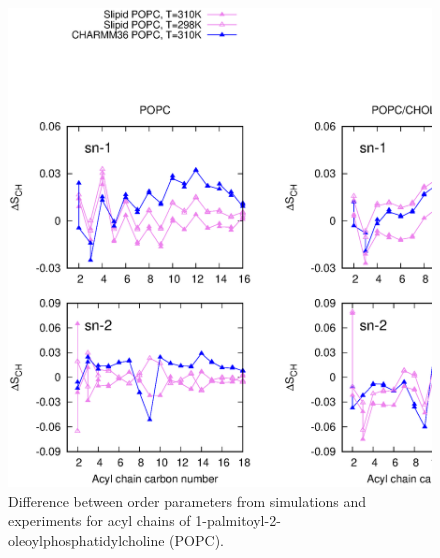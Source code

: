 \documentclass[aps,prl,superscriptaddress,twocolumn]{revtex4}
\begin{document}
\begin{figure}[]
  \centering
  \includegraphics[width=17.2cm]{../FIGS/OrderParametersCHOLfitness.eps}
  \caption{\label{OrderParametersCHOL}
    Difference between order parameters from simulations and experiments for acyl chains of  1-palmitoyl-2-oleoylphosphatidylcholine (POPC).
  }
\end{figure}
\end{document}
